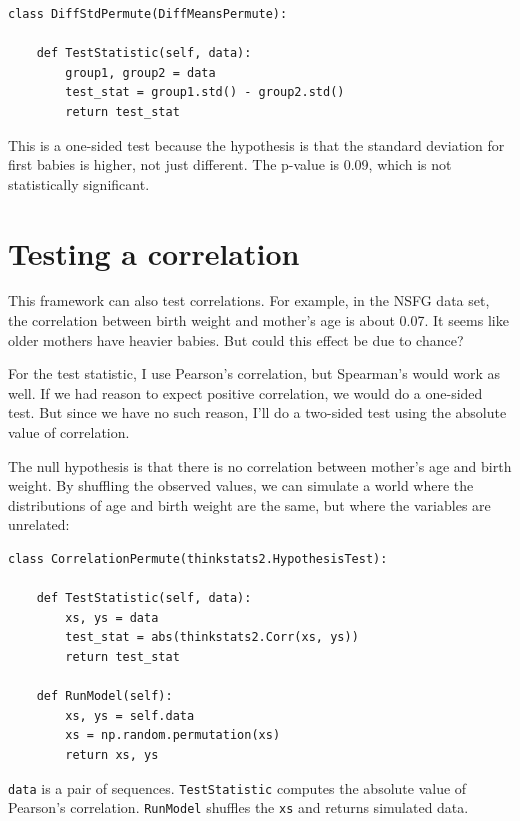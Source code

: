 \documentclass[12pt]{book}
\begin{document}
\begin{verbatim}
class DiffStdPermute(DiffMeansPermute):

    def TestStatistic(self, data):
        group1, group2 = data
        test_stat = group1.std() - group2.std()
        return test_stat
\end{verbatim}

This is a one-sided test because the hypothesis is that the standard
deviation for first babies is higher, not just different.  The p-value
is 0.09, which is not statistically significant.
   


\section{Testing a correlation}
\label{corrtest}

This framework can also test correlations.  For example, in the NSFG
data set, the correlation between birth weight and mother's age is
about 0.07.  It seems like older mothers have heavier babies.  But
could this effect be due to chance?

For the test statistic, I use
Pearson's correlation, but Spearman's would work as well.
If we had reason to expect positive correlation, we would do a
one-sided test.  But since we have no such reason, I'll
do a two-sided test using the absolute value of correlation.

The null hypothesis is that there is no correlation between mother's
age and birth weight.  By shuffling the observed values, we can
simulate a world where the distributions of age and
birth weight are the same, but where the variables are unrelated:

\begin{verbatim}
class CorrelationPermute(thinkstats2.HypothesisTest):

    def TestStatistic(self, data):
        xs, ys = data
        test_stat = abs(thinkstats2.Corr(xs, ys))
        return test_stat

    def RunModel(self):
        xs, ys = self.data
        xs = np.random.permutation(xs)
        return xs, ys
\end{verbatim}

\verb"data" is a pair of sequences.  \verb"TestStatistic" computes the
absolute value of Pearson's correlation.  \verb"RunModel" shuffles the
\verb"xs" and returns simulated data.
\end{document}
